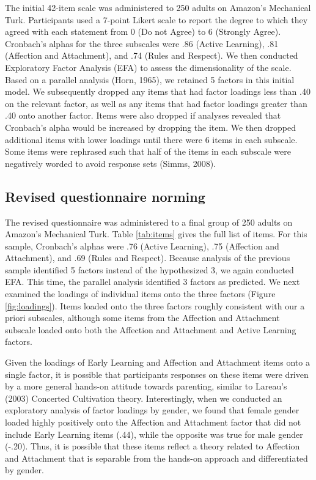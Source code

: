 \documentclass[10pt, letterpaper]{article}
\begin{document}
The initial 42-item scale was administered to 250 adults on Amazon's
Mechanical Turk. Participants used a 7-point Likert scale to report the
degree to which they agreed with each statement from 0 (Do not Agree) to
6 (Strongly Agree). Cronbach's alphas for the three subscales were .86
(Active Learning), .81 (Affection and Attachment), and .74 (Rules and
Respect). We then conducted Exploratory Factor Analysis (EFA) to assess
the dimensionality of the scale. Based on a parallel analysis (Horn,
1965), we retained 5 factors in this initial model. We subsequently
dropped any items that had factor loadings less than .40 on the relevant
factor, as well as any items that had factor loadings greater than .40
onto another factor. Items were also dropped if analyses revealed that
Cronbach's alpha would be increased by dropping the item. We then
dropped additional items with lower loadings until there were 6 items in
each subscale. Some items were rephrased such that half of the items in
each subscale were negatively worded to avoid response sets (Simms,
2008).

\subsection{Revised questionnaire
norming}\label{revised-questionnaire-norming}

The revised questionnaire was administered to a final group of 250
adults on Amazon's Mechanical Turk. Table \ref{tab:items} gives the full
list of items. For this sample, Cronbach's alphas were .76 (Active
Learning), .75 (Affection and Attachment), and .69 (Rules and Respect).
Because analysis of the previous sample identified 5 factors instead of
the hypothesized 3, we again conducted EFA. This time, the parallel
analysis identified 3 factors as predicted. We next examined the
loadings of individual items onto the three factors (Figure
\ref{fig:loadings}). Items loaded onto the three factors roughly
consistent with our a priori subscales, although some items from the
Affection and Attachment subscale loaded onto both the Affection and
Attachment and Active Learning factors.

Given the loadings of Early Learning and Affection and Attachment items
onto a single factor, it is possible that participants responses on
these items were driven by a more general hands-on attitude towards
parenting, similar to Lareau's (2003) Concerted Cultivation theory.
Interestingly, when we conducted an exploratory analysis of factor
loadings by gender, we found that female gender loaded highly positively
onto the Affection and Attachment factor that did not include Early
Learning items (.44), while the opposite was true for male gender
(-.20). Thus, it is possible that these items reflect a theory related
to Affection and Attachment that is separable from the hands-on approach
and differentiated by gender.
\end{document}
